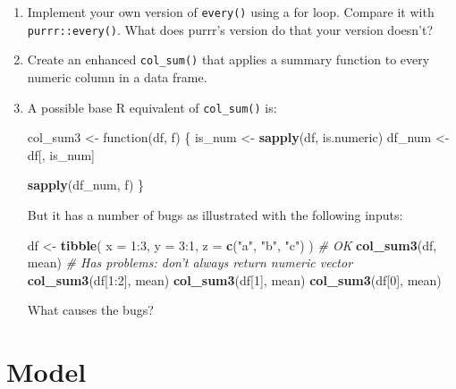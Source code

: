 \documentclass[]{book}
\newenvironment{Shaded}{\begin{snugshade}}{\end{snugshade}}
\newcommand{\KeywordTok}[1]{\textcolor[rgb]{0.13,0.29,0.53}{\textbf{{#1}}}}
\newcommand{\DataTypeTok}[1]{\textcolor[rgb]{0.13,0.29,0.53}{{#1}}}
\newcommand{\DecValTok}[1]{\textcolor[rgb]{0.00,0.00,0.81}{{#1}}}
\newcommand{\StringTok}[1]{\textcolor[rgb]{0.31,0.60,0.02}{{#1}}}
\newcommand{\CommentTok}[1]{\textcolor[rgb]{0.56,0.35,0.01}{\textit{{#1}}}}
\newcommand{\NormalTok}[1]{{#1}}
\begin{document}
\begin{enumerate}
\def\labelenumi{\arabic{enumi}.}
\item
  Implement your own version of \texttt{every()} using a for loop.
  Compare it with \texttt{purrr::every()}. What does purrr's version do
  that your version doesn't?
\item
  Create an enhanced \texttt{col\_sum()} that applies a summary function
  to every numeric column in a data frame.
\item
  A possible base R equivalent of \texttt{col\_sum()} is:

\begin{Shaded}
\begin{Highlighting}[]
\NormalTok{col_sum3 <-}\StringTok{ }\NormalTok{function(df, f) \{}
  \NormalTok{is_num <-}\StringTok{ }\KeywordTok{sapply}\NormalTok{(df, is.numeric)}
  \NormalTok{df_num <-}\StringTok{ }\NormalTok{df[, is_num]}

  \KeywordTok{sapply}\NormalTok{(df_num, f)}
\NormalTok{\}}
\end{Highlighting}
\end{Shaded}

  But it has a number of bugs as illustrated with the following inputs:

\begin{Shaded}
\begin{Highlighting}[]
\NormalTok{df <-}\StringTok{ }\KeywordTok{tibble}\NormalTok{(}
  \DataTypeTok{x =} \DecValTok{1}\NormalTok{:}\DecValTok{3}\NormalTok{, }
  \DataTypeTok{y =} \DecValTok{3}\NormalTok{:}\DecValTok{1}\NormalTok{,}
  \DataTypeTok{z =} \KeywordTok{c}\NormalTok{(}\StringTok{"a"}\NormalTok{, }\StringTok{"b"}\NormalTok{, }\StringTok{"c"}\NormalTok{)}
\NormalTok{)}
\CommentTok{# OK}
\KeywordTok{col_sum3}\NormalTok{(df, mean)}
\CommentTok{# Has problems: don't always return numeric vector}
\KeywordTok{col_sum3}\NormalTok{(df[}\DecValTok{1}\NormalTok{:}\DecValTok{2}\NormalTok{], mean)}
\KeywordTok{col_sum3}\NormalTok{(df[}\DecValTok{1}\NormalTok{], mean)}
\KeywordTok{col_sum3}\NormalTok{(df[}\DecValTok{0}\NormalTok{], mean)}
\end{Highlighting}
\end{Shaded}

  What causes the bugs?
\end{enumerate}

\part{Model}\label{part-model}
\end{document}
